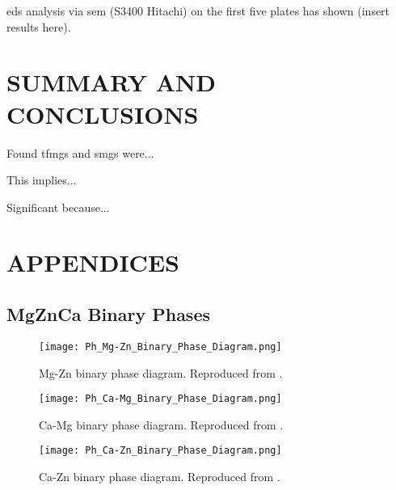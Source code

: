 \documentclass[a4paper,12pt,oneside]{report}%
\begin{document}
\Gls{eds} analysis via \gls{sem} (S3400 Hitachi) on the first five plates has shown (insert results here). 


\chapter{SUMMARY AND CONCLUSIONS}
\glsresetall

Found \glspl{tfmg} and \glspl{smg} were...

This implies...

Significant because...







\chapter{APPENDICES}

\section{MgZnCa Binary Phases}

\begin{figure}[h]
	\centering
	\texttt{[image: Ph\_Mg-Zn\_Binary\_Phase\_Diagram.png]}
	\caption[Mg-Zn binary phase diagram.]{Mg-Zn binary phase diagram. Reproduced from \cite{Predel1997}.}
	\label{fig:MgZnDiagram}
\end{figure}

\begin{figure}[h]
	\centering
	\texttt{[image: Ph\_Ca-Mg\_Binary\_Phase\_Diagram.png]}
	\caption[Ca-Mg binary phase diagram.]{Ca-Mg binary phase diagram. Reproduced from \cite{Nayeb1987}.}
	\label{fig:CaMgDiagram}
\end{figure}

\begin{figure}[h]
	\centering
	\texttt{[image: Ph\_Ca-Zn\_Binary\_Phase\_Diagram.png]}
	\caption[Ca-Zn binary phase diagram.]{Ca-Zn binary phase diagram. Reproduced from \cite{Itkin1990}.}
	\label{fig:CaZnDiagram}
\end{figure}
\end{document}
